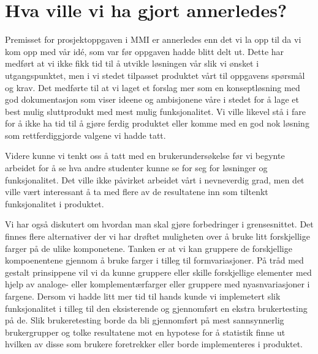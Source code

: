 \section{Hva ville vi ha gjort annerledes?}
Premisset for prosjektoppgaven i MMI er annerledes enn det vi la opp til da vi kom opp med vår idé, som var før oppgaven hadde blitt delt ut. Dette har medført at vi ikke fikk tid til å utvikle løsningen vår slik vi ønsket i utgangspunktet, men i vi stedet tilpasset produktet vårt til oppgavens spørsmål og krav.
Det medførte til at vi laget et forslag mer som en konseptløsning med god dokumentasjon som viser ideene og ambisjonene våre i stedet for å lage et best mulig sluttprodukt med mest mulig funksjonalitet. Vi ville likevel stå i fare for å ikke ha tid til å gjøre ferdig produktet eller komme med en god nok løsning som rettferdiggjorde valgene vi hadde tatt.

Videre kunne vi tenkt oss å tatt med en brukerundersøkelse før vi begynte arbeidet for å se hva andre studenter kunne se for seg for løsninger og funksjonalitet. Det ville ikke påvirket arbeidet vårt i nevneverdig grad, men det ville vært interessant å ta med flere av de resultatene inn som tiltenkt funksjonalitet i produktet.

Vi har også diskutert om hvordan man skal gjøre forbedringer i grensesnittet. Det finnes flere alternativer der vi har drøftet muligheten over å bruke litt forskjellige farger på de ulike komponetene. Tanken er at vi kan gruppere de forskjellige kompoenentene gjennom å bruke farger i tilleg til formvariasjoner. På tråd med gestalt prinsippene vil vi da kunne gruppere eller skille forskjellige elementer med hjelp av analoge- eller komplementærfarger eller gruppere med nyasnvariasjoner i fargene. Dersom vi hadde litt mer tid til hands kunde vi implemetert slik funksjonalitet i tilleg til den eksisterende og gjennomført en ekstra brukertesting på de. Slik brukeretesting borde da bli gjennomført på mest sannsynnerlig brukergrupper og tolke resultatene mot en hypotese for å statistik finne ut hvilken av disse som brukere foretrekker eller borde implementeres i produktet.

